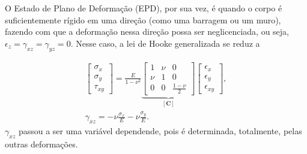 O Estado de Plano de Deformação (EPD), por sua vez, é quando o corpo é suficientemente rígido em uma direção (como uma barragem ou um muro), fazendo com que a deformação nessa direção possa ser neglicenciada, ou seja, $\epsilon_z = \gamma_{xz} = \gamma_{yz} = 0$. Nesse caso, a lei de Hooke generalizada se reduz a

\begin{gather}
    \begin{bmatrix}
        \sigma_x \\
        \sigma_y \\
        \tau_{xy}
    \end{bmatrix} = \frac{E}{1-\nu^2} 
    \underbrace{\begin{bmatrix}
        1 & \nu & 0 \\
        \nu & 1 & 0 \\
        0 & 0 & \frac{1-\nu}{2}
    \end{bmatrix}}_{[\bm{C}]}
    \begin{bmatrix}
        \epsilon_x \\
        \epsilon_y \\
        \epsilon_{xy}
    \end{bmatrix}, \\
    \gamma_{xz} = -\nu \frac{\sigma_x}{E} - \nu \frac{\sigma_y}{E}.
\end{gather}
$\gamma_{xz}$ passou a ser uma variável dependende, pois é determinada, totalmente, pelas outras deformações. \cite{lub}